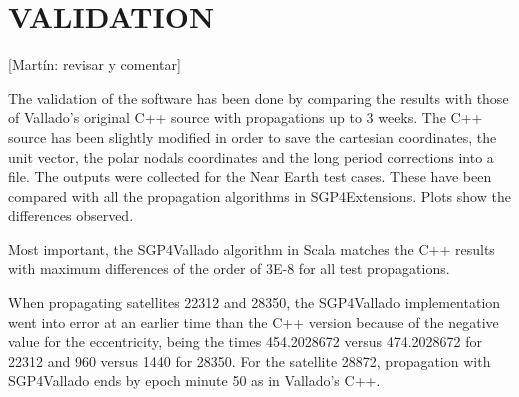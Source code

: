 \documentclass{article}
\begin{document}



\section{VALIDATION}
\label{sec:validation}
[{\color{red}Mart\'in: revisar y comentar}]

The validation of the software has been done by comparing the results with those
of Vallado's original C++ source with propagations up to 3 weeks. The C++ source has been slightly modified in order
to save the cartesian coordinates, the unit vector, the polar nodals coordinates
and the long period corrections into a file. The outputs were collected
for the Near Earth test cases. These have been compared with all the propagation
algorithms in SGP4Extensions. Plots show the differences observed.

Most important, the SGP4Vallado algorithm in Scala matches the C++ results with maximum differences
of the order of 3E-8 for all test propagations.

When propagating satellites 22312 and 28350, the SGP4Vallado implementation went into error at an earlier time
than the C++ version because of the negative value for the eccentricity, being the times 454.2028672 versus 474.2028672 for 22312 and 960 versus 1440 for 28350.
For the satellite 28872, propagation with SGP4Vallado ends by epoch minute 50 as in Vallado's C++.
\end{document}

